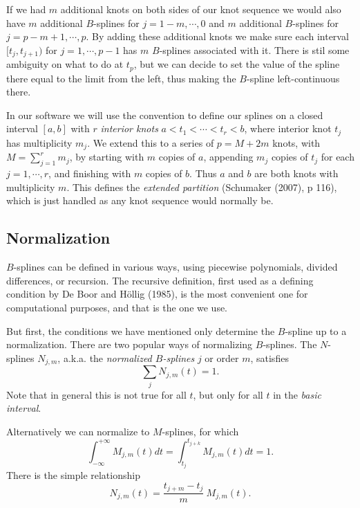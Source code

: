 \documentclass[
  12pt,
]{article}
\begin{document}
If we had \(m\) additional knots on both sides of our knot sequence we
would also have \(m\) additional \(B\)-splines for \(j=1-m,\cdots,0\)
and \(m\) additional \(B\)-splines for \(j=p-m+1,\cdots,p\). By adding
these additional knots we make sure each interval \([t_j,t_{j+1})\) for
\(j=1,\cdots,p-1\) has \(m\) \(B\)-splines associated with it. There is
stil some ambiguity on what to do at \(t_p\), but we can decide to set
the value of the spline there equal to the limit from the left, thus
making the \(B\)-spline left-continuous there.

In our software we will use the convention to define our splines on a
closed interval \([a,b]\) with \(r\) \emph{interior knots}
\(a<t_1<\cdots<t_r<b\), where interior knot \(t_j\) has multiplicity
\(m_j\). We extend this to a series of \(p=M+2m\) knots, with
\(M=\sum_{j=1}^r m_j\), by starting with \(m\) copies of \(a\),
appending \(m_j\) copies of \(t_j\) for each \(j=1,\cdots,r\), and
finishing with \(m\) copies of \(b\). Thus \(a\) and \(b\) are both
knots with multiplicity \(m\). This defines the \emph{extended
partition} (Schumaker (2007), p 116), which is just handled as any knot
sequence would normally be.

\hypertarget{normalization}{%
\subsection{Normalization}\label{normalization}}

\(B\)-splines can be defined in various ways, using piecewise
polynomials, divided differences, or recursion. The recursive
definition, first used as a defining condition by De Boor and Höllig
(1985), is the most convenient one for computational purposes, and that
is the one we use.

But first, the conditions we have mentioned only determine the
\(B\)-spline up to a normalization. There are two popular ways of
normalizing \(B\)-splines. The \(N\)-splines \(N_{j,m}\), a.k.a. the
\emph{normalized \(B\)-splines} \(j\) or order \(m\), satisfies
\begin{equation}\label{E:nsum}
\sum_{j}N_{j,m}(t)=1.
\end{equation} Note that in general this is not true for all \(t\), but
only for all \(t\) in the \emph{basic interval}.

Alternatively we can normalize to \(M\)-splines, for which
\begin{equation}\label{E:mint}
\int_{-\infty}^{+\infty}M_{j,m}(t)dt=\int_{t_j}^{t_{j+k}}M_{j,m}(t)dt=1.
\end{equation} There is the simple relationship
\begin{equation}\label{E:NM}
N_{j,m}(t)=\frac{t_{j+m}-t_j}{m}\ M_{j,m}(t).
\end{equation}
\end{document}

